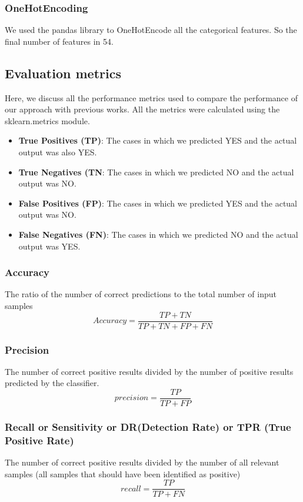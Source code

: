 \documentclass[14pt, conference]{IEEEtran}
\begin{document}
\subsubsection{OneHotEncoding}
We used the pandas library to OneHotEncode all the categorical features. So the final number of features in 54.


\subsection{Evaluation metrics}
Here, we discuss all the performance metrics used to compare the performance of our approach with previous works. All the metrics were calculated using the sklearn.metrics module.
\begin{itemize}
    \item \textbf{True Positives (TP)}: The cases in which we predicted YES and the actual output was also YES.
    \item \textbf{True Negatives (TN}: The cases in which we predicted NO and the actual output was NO.
    \item \textbf{False Positives (FP)}: The cases in which we predicted YES and the actual output was NO.
    \item \textbf{False Negatives (FN)}: The cases in which we predicted NO and the actual output was YES.
\end{itemize}

\subsubsection{Accuracy}
The ratio of the number of correct predictions to the total number of input samples
\begin{equation}
    Accuracy = \frac{TP+TN}{TP+TN+FP+FN}
\end{equation}

\subsubsection{Precision}
The number of correct positive results divided by the number of positive results predicted by the classifier.
\begin{equation}
    precision = \frac{TP}{TP+FP}
\end{equation}

\subsubsection{Recall or Sensitivity or DR(Detection Rate) or TPR (True Positive Rate)}
The number of correct positive results divided by the number of all relevant samples (all samples that should have been identified as positive)
\begin{equation}
    recall = \frac{TP}{TP+FN}
\end{equation}
\end{document}
